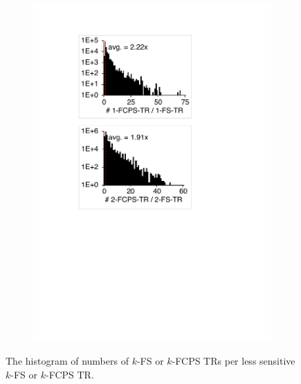 \begin{figure}
\begin{subfigure}{0.24\textwidth}
    \includegraphics[width=\textwidth]{img/2-fcps-hist}
  \end{subfigure}
  \caption{
    The histogram of numbers of $k$-FS or $k$-FCPS TRs per less sensitive $k$-FS
    or $k$-FCPS TR.
  }
  \label{fig:hist}
\end{figure}



